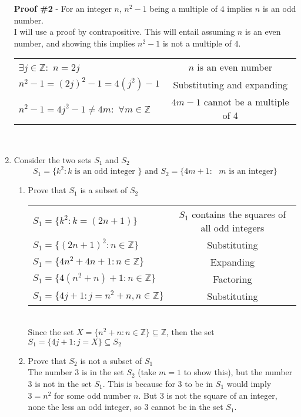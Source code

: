 \documentclass[a4paper,11pt]{article}
\begin{document}
\begin{enumerate}
\textbf{Proof \#2} - For an integer $n$, $n^2-1$ being a multiple of $4$ implies $n$ is an odd number. \\[.1in]
I will use a proof by contrapositive. This will entail assuming $n$ is an even number, and showing this implies $n^2-1$ is not a multiple of $4$. \\[.2in]
\begin{tabular}{l | c}
$\exists j \in \mathbb{Z} : $ $n = 2j$                   & $n$ is an even number \\
$n^2-1 = (2j)^2 -1 = 4(j^2) -1$                          & Substituting and expanding \\
$n^2-1 = 4j^2 - 1 \neq 4m :$ $\forall m \in \mathbb{Z}$  & $4m - 1$ cannot be a multiple of 4 \\
\end{tabular} \\



\item Consider the two sets $S_1$ and $S_2$ \\
$$ S_1 = \{ k^2 : k \text{ is an odd integer } \} \text{ and } S_2 = \{ 4m+1 : \text{ $m$ is an integer} \} $$

\begin{enumerate}
\item Prove that $S_1$ is a subset of $S_2$ \\

\begin{tabular}{l | c}
$ S_1 = \{k^2 : k = (2n+1) \}$                       &  $S_1$ contains the squares of all odd integers \\
$ S_1 = \{(2n+1)^2 : n \in \mathbb{Z} \}$            & Substituting \\ 
$ S_1 = \{ 4n^2 + 4n + 1 : n \in \mathbb{Z} \}$      & Expanding \\
$ S_1 = \{ 4(n^2+n) + 1 : n \in \mathbb{Z}  \}$      & Factoring \\
$ S_1 = \{ 4j + 1 : j = n^2+n, n \in \mathbb{Z} \}$  & Substituting \\
\end{tabular} \\[.15in]
Since the set $X = \{ n^2+n : n \in \mathbb{Z} \} \subseteq \mathbb{Z}$, then 
the set $S_1 = \{ 4j + 1 : j = X \} \subseteq S_2$

\item Prove that $S_2$ is not a subset of $S_1$ \\
The number $3$ is in the set $S_2$ (take $m = 1$ to show this), but the number $3$ is not in the set $S_1$. This is because for $3$ to be in $S_1$ would imply $3 = n^2$ for some odd number $n$. But $3$ is not the square of an integer, none the less an odd integer, so 3 cannot be in the set $S_1$.


\end{enumerate}
\end{enumerate}
\end{document}
